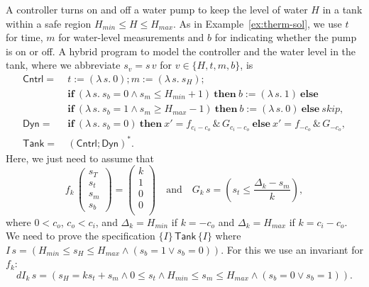 \documentclass[envcountsame]{llncs}
\newcommand{\IF}[3]{\mathbf{if}\ #1\ \mathbf{then}\ #2\ \mathbf{else}\ #3}
\begin{document}
\begin{example}\label{ex:tank-inv}
A controller turns on and off a water pump to keep the level of water $H$ in a tank within a safe region $H_{min}\leq H\leq H_{max}$. As in Example~\ref{ex:therm-sol}, we use $t$ for time, $m$ for water-level measurements and $b$ for indicating whether the pump is on or off. A hybrid program to model the controller and the water level in the tank, where we abbreviate $s_v=s\, v$ for $v\in\{H,t,m,b\}$, is
\begin{align*}
	\mathsf{Cntrl} = &\ {t:=(\lambda\, s.\ 0)};{m:=(\lambda\, s.\ s_H)};\\
				&\ \IF {(\lambda\, s.\ s_b=0 \land s_m\leq H_{min} + 1)} {b:=(\lambda\, s.\ 1)} {}\\
				&\ \IF {(\lambda\, s.\ s_b=1 \land s_m\geq H_{max} - 1)} {b:=(\lambda\, s.\ 0)} {\mathit{skip}},\\
	\mathsf{Dyn} = &\ \IF {(\lambda\, s.\ s_b=0)} {x' = f_{c_i-c_o}\, \&\, G_{c_i-c_o}} {x' = f_{-c_o}\, \&\, G_{-c_o}},\\
	\mathsf{Tank} = &\ (\mathsf{Cntrl}{;}\mathsf{Dyn})^\ast.
\end{align*}
Here, we just need to assume that
 \begin{equation*}
    f_k\,
    \begin{pmatrix}
      s_T\\
      s_t\\
	s_m\\
	s_b
    \end{pmatrix}
=
\begin{pmatrix}
  k\\
  1\\
  0\\
  0\\
\end{pmatrix}\quad\text{and}\quad
G_k\, s = \left(s_t\leq \frac{\Delta_k-s_m}{k}\right),
\end{equation*}
where $0 < c_o$, $c_o < c_i$, and $\Delta_k=H_{min}$ if $k=-c_o$ and
$\Delta_k = H_{max}$ if $k=c_i-c_o$. We need to prove the
specification $\{I\}\, \mathsf{Tank}\, \{I\}$ where
$I\, s=\left(H_{min}\leq s_H\leq H_{max}\land (s_b = 1 \lor
  s_b=0)\right)$. For this we use an invariant for $f_k$:
\begin{equation*}
dI_k\, s = \left(s_H=ks_t+s_m\land 0\leq s_t\land H_{min}\leq s_m\leq H_{max} \land (s_b=0\lor s_b=1)\right).
\end{equation*}


\end{example}
\end{document}
